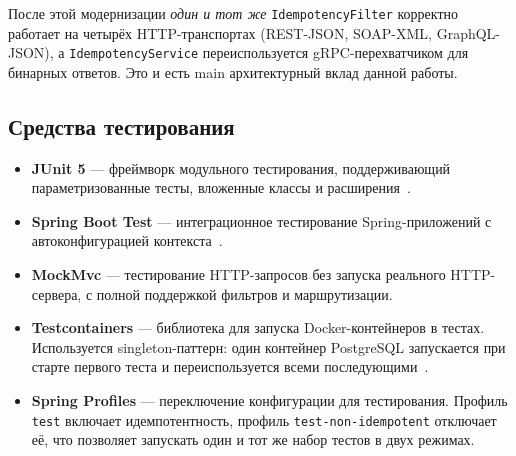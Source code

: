 После этой модернизации \emph{один и тот же} \texttt{IdempotencyFilter} корректно работает на четырёх HTTP-транспортах (REST-JSON, SOAP-XML, GraphQL-JSON), а \texttt{IdempotencyService} переиспользуется gRPC-перехватчиком для бинарных ответов. Это и есть main архитектурный вклад данной работы.

\subsection{Средства тестирования}

\begin{itemize}
    \item \textbf{JUnit 5} --- фреймворк модульного тестирования, поддерживающий параметризованные тесты, вложенные классы и расширения~\cite{beck2002test}.
    \item \textbf{Spring Boot Test} --- интеграционное тестирование Spring-приложений с автоконфигурацией контекста~\cite{spring-boot-testing}.
    \item \textbf{MockMvc} --- тестирование HTTP-запросов без запуска реального HTTP-сервера, с полной поддержкой фильтров и маршрутизации.
    \item \textbf{Testcontainers} --- библиотека для запуска Docker-контейнеров в тестах. Используется singleton-паттерн: один контейнер PostgreSQL запускается при старте первого теста и переиспользуется всеми последующими~\cite{testcontainers}.
    \item \textbf{Spring Profiles} --- переключение конфигурации для тестирования. Профиль \texttt{test} включает идемпотентность, профиль \texttt{test-non-idempotent} отключает её, что позволяет запускать один и тот же набор тестов в двух режимах.
\end{itemize}
